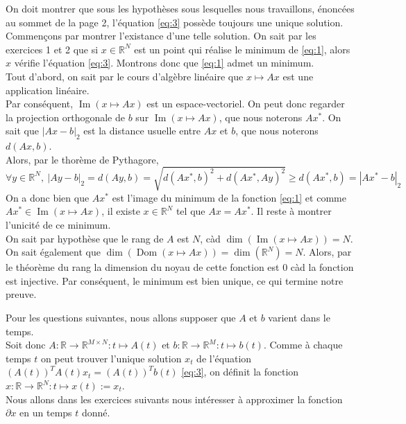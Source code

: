 \documentclass[a4paper, 10pt]{article}
\newcommand{\IR}{\mathbb{R}}
\newcommand{\Image}{\operatorname{Im}}
\begin{document}
On doit montrer que sous les hypothèses sous lesquelles nous travaillons, énoncées au sommet de la page 2, l'équation \eqref{eq:3} possède toujours une unique solution. \\
Commençons par montrer l'existance d'une telle solution. On sait par les exercices 1 et 2 que si \( x \in \IR^N \) est un point qui réalise le minimum de \eqref{eq:1}, alors \( x \) vérifie l'équation \eqref{eq:3}. Montrons donc que \eqref{eq:1} admet un minimum. \\
Tout d'abord, on sait par le cours d'algèbre linéaire que \( x \mapsto Ax \) est une application linéaire. \\
Par conséquent, \( \Image(x \mapsto Ax) \) est un espace-vectoriel. On peut donc regarder la projection orthogonale de \( b \) sur \( \Image(x \mapsto Ax) \), que nous noterons \( Ax^* \). On sait que \( |Ax - b|_2 \) est la distance usuelle entre \( Ax \) et \( b \), que nous noterons \( d(Ax, b) \). \\
Alors, par le thorème de Pythagore,
$$
\forall y \in \IR^N,~ |Ay - b|_2 = d(Ay, b) = \sqrt{d(Ax^*, b)^2 + d(Ax^*, Ay)^2} \geq d(Ax^*, b) = |Ax^* - b|_2
$$
On a donc bien que \( Ax^* \) est l'image du minimum de la fonction \eqref{eq:1} et comme \( Ax^* \in \Image(x \mapsto Ax) \), il existe \( x \in \IR^N \) tel que \( Ax = Ax^* \). Il reste à montrer l'unicité de ce minimum. \\
On sait par hypothèse que le rang de \( A \) est \( N \), càd \( \dim{(\Image(x \mapsto Ax))} = N \). \\
On sait également que \( \dim{(\operatorname{Dom}(x \mapsto Ax))} = \dim{(\IR^N)} = N \). Alors, par le théorème du rang la dimension du noyau de cette fonction est 0 càd la fonction est injective. Par conséquent, le minimum est bien unique, ce qui termine notre preuve.

\newpage

\noindent
Pour les questions suivantes, nous allons supposer que \( A \) et \( b \) varient dans le temps. \\
Soit donc \( A : \IR \to \IR^{M \times N} : t \mapsto A(t) \) et \( b : \IR \to \IR^M : t \mapsto b(t) \). Comme à chaque temps \( t \) on peut trouver l'unique solution \( x_t \) de l'équation \( (A(t))^T A(t) x_t = (A(t))^T b(t) \) \eqref{eq:3}, on définit la fonction \( x : \IR \to \IR^N : t \mapsto x(t) := x_t \). \\
Nous allons dans les exercices suivants nous intéresser à approximer la fonction \( \partial x \) en un temps \( t \) donné.
\end{document}

